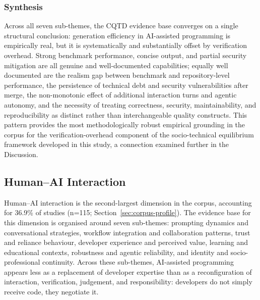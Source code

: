 \subsubsection{Synthesis}
\label{sec:cqtd-synthesis}
Across all seven sub-themes, the CQTD evidence base converges on a single structural conclusion: generation efficiency in AI-assisted programming is empirically real, but it is systematically and substantially offset by verification overhead. Strong benchmark performance, concise output, and partial security mitigation are all genuine and well-documented capabilities; equally well documented are the realism gap between benchmark and repository-level performance, the persistence of technical debt and security vulnerabilities after merge, the non-monotonic effect of additional interaction turns and agentic autonomy, and the necessity of treating correctness, security, maintainability, and reproducibility as distinct rather than interchangeable quality constructs. This pattern provides the most methodologically robust empirical grounding in the corpus for the verification-overhead component of the socio-technical equilibrium framework developed in this study, a connection examined further in the Discussion.

\subsection{Human--AI Interaction}
\label{sec:hai}
Human--AI interaction is the second-largest dimension in the corpus, accounting for 36.9\% of studies (n=115; Section~\ref{sec:corpus-profile}). The evidence base for this dimension is organised around seven sub-themes: prompting dynamics and conversational strategies, workflow integration and collaboration patterns, trust and reliance behaviour, developer experience and perceived value, learning and educational contexts, robustness and agentic reliability, and identity and socio-professional continuity. Across these sub-themes, AI-assisted programming appears less as a replacement of developer expertise than as a reconfiguration of interaction, verification, judgement, and responsibility: developers do not simply receive code, they negotiate it.

